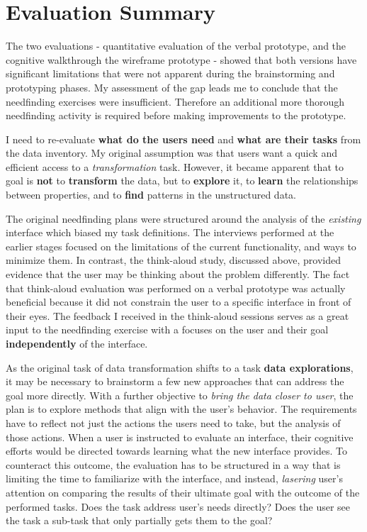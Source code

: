 \documentclass[12pt,letterpaper]{article}
\begin{document}
\section*{Evaluation Summary}

The two evaluations - quantitative evaluation of the verbal prototype, and the cognitive walkthrough the wireframe prototype -  showed that both versions have significant limitations that were not apparent during the brainstorming and prototyping phases. My assessment of the gap leads me to conclude that the needfinding exercises were insufficient. Therefore an additional more thorough needfinding activity is required before making improvements to the prototype.  

I need to re-evaluate \textbf{what do the users need} and \textbf{what are their tasks} from the data inventory. My original assumption was that users want a quick and efficient access to a \textit{transformation} task. However, it became apparent that to goal is \textbf{not} to \textbf{transform} the data, but to \textbf{explore} it, to \textbf{learn} the relationships between properties, and to \textbf{find} patterns in the unstructured data. 

The original needfinding plans were structured around the analysis of the \textit{existing} interface which biased my task definitions. The interviews performed at the earlier stages focused on the limitations of the current functionality, and ways to minimize them. In contrast, the think-aloud study, discussed above, provided evidence that the user may be thinking about the problem differently. The fact that think-aloud evaluation was performed on a verbal prototype was actually beneficial because it did not constrain the user to a specific interface in front of their eyes. The feedback I received in the think-aloud sessions serves as a great input to the needfinding exercise with a focuses on the user and their goal \textbf{independently} of the interface.  


As the original task of data transformation shifts to a task \textbf{data explorations}, it may be necessary to brainstorm a few new approaches that can address the goal more directly. With a further objective to \textit{bring the data closer to user}, the plan is to explore methods that align with the user's behavior. The requirements have to reflect not just the actions the users need to take, but the analysis of those actions. When a user is instructed to evaluate an interface, their cognitive efforts would be directed towards learning what the new interface provides. To counteract this outcome, the evaluation has to be structured in a way that is limiting the time to familiarize with the interface, and instead, \textit{lasering} user's attention on comparing the results of their ultimate goal with the outcome of the performed tasks. Does the task address user's needs directly? Does the user see the task a sub-task that only partially gets them to the goal? 
\end{document}

